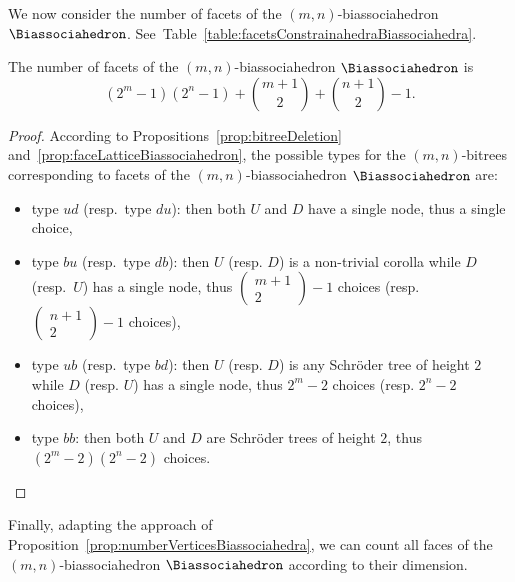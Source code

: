 \documentclass[AHL,Unicode,longabstracts,published]{cedram}
\begin{document}
We now consider the number of facets of the $(m,n)$-biassociahedron $\Biassociahedron$. See~Table~\ref{table:facetsConstrainahedraBiassociahedra}.

\begin{prop}\label{prop:numberFacetsBiassociahedra}
The number of facets of the $(m,n)$-biassociahedron \linebreak $\Biassociahedron$ is
\[
\textstyle{ (2^m-1)(2^n-1) + \binom{m+1}{2} + \binom{n+1}{2} - 1.}
\]
\end{prop}

\begin{proof}
According to Propositions~\ref{prop:bitreeDeletion} and~\ref{prop:faceLatticeBiassociahedron}, the possible types for the \linebreak $(m,n)$-bitrees corresponding to facets of the $(m,n)$-biassociahedron $\Biassociahedron$ are:
\begin{itemize}
\item type $ud$ (resp.~type $du$): then both $U$ and $D$ have a single node, thus a single choice,
\item type $bu$ (resp.~type $db$): then $U$ (resp. $D$) is a non-trivial corolla while $D$ (resp.~$U$) has a single node, thus $(\begin{smallmatrix}m+1\\2\end{smallmatrix})-1$ choices (resp. $(\begin{smallmatrix}n+1\\2\end{smallmatrix})-1$ choices),
\item type $ub$ (resp.~type $bd$): then $U$ (resp. $D$) is any Schr\"oder tree of height $2$ while $D$ (resp. $U$) has a single node, thus $2^m-2$ choices (resp. $2^n-2$ choices),
\item type $bb$: then both $U$ and $D$ are Schr\"oder trees of height $2$, thus $(2^m-2)(2^n-2)$ choices.
\qedhere
\end{itemize}
\end{proof}

Finally, adapting the approach of Proposition~\ref{prop:numberVerticesBiassociahedra}, we can count all faces of the $(m,n)$-biassocia\-hedron $\Biassociahedron$ according to their dimension.
\end{document}
